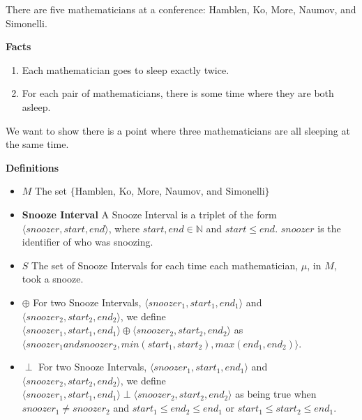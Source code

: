 \documentclass[fleqn]{article}
\newcommand{\triple}[3]{\langle #1,#2,#3 \rangle}
\newcommand{\set}[1]{\lbrace #1 \rbrace}
\newcommand{\iunion}{\oplus}
\newcommand{\ioverlap}{\perp}
\begin{document}
There are five mathematicians at a conference: Hamblen, Ko, More, Naumov, and Simonelli.

\textbf{Facts}
\begin{enumerate}
  \item  Each mathematician goes to sleep exactly twice.

  \item  For each pair of mathematicians, there is some time where
         they are both asleep.
\end{enumerate}

We want to show there is a point where three mathematicians are all sleeping at the same time.

\textbf{Definitions}
\begin{itemize}
  \item \textbf{$M$} The set $\set{$Hamblen, Ko, More, Naumov, and Simonelli$}$
  \item \textbf{Snooze Interval} A Snooze Interval is a triplet of
        the form $\triple{snoozer}{start}{end}$, where $start, end \in \mathbb{N}$ and $start \leq end$. $snoozer$ is the identifier of who was snoozing.
  \item \textbf{$S$} The set of Snooze Intervals for each time each mathematician, $\mu$, in $M$, took a snooze.
  \item \textbf{$\iunion$} For two Snooze Intervals,
                         $\triple{snoozer_1}{start_1}{end_1}$ and
                         $\triple{snoozer_2}{start_2}{end_2}$, we define
                         $\triple{snoozer_1}{start_1}{end_1} \iunion
                          \triple{snoozer_2}{start_2}{end_2}$ as \\
                         $\triple{snoozer_1 and snoozer_2}
                                 {min(start_1, start_2)}
                                 {max(end_1,end_2)}$.

  \item \textbf{$\ioverlap$} For two Snooze Intervals,
                         $\triple{snoozer_1}{start_1}{end_1}$ and
                         $\triple{snoozer_2}{start_2}{end_2}$, we define
                         $\triple{snoozer_1}{start_1}{end_1} \ioverlap
                          \triple{snoozer_2}{start_2}{end_2}$ as being true
                         when\\$snoozer_1 \not= snoozer_2$ and $start_1 \leq end_2 \leq end_1$ or
                                $start_1 \leq start_2 \leq end_1$.


\end{itemize}
\end{document}
